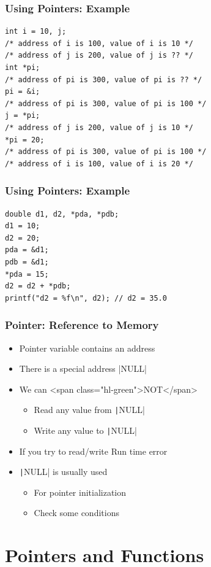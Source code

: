 \documentclass{../c-lecture}
\begin{document}
\begin{frame}[fragile]
  \frametitle{Using Pointers: Example}
  \begin{verbatim}
int i = 10, j;
/* address of i is 100, value of i is 10 */
/* address of j is 200, value of j is ?? */
int *pi;
/* address of pi is 300, value of pi is ?? */
pi = &i;
/* address of pi is 300, value of pi is 100 */
j = *pi;
/* address of j is 200, value of j is 10 */
*pi = 20;
/* address of pi is 300, value of pi is 100 */
/* address of i is 100, value of i is 20 */
  \end{verbatim}
\end{frame}

\begin{frame}[fragile]
  \frametitle{Using Pointers: Example}
  \begin{verbatim}
double d1, d2, *pda, *pdb;
d1 = 10;
d2 = 20;
pda = &d1;
pdb = &d1;
*pda = 15;
d2 = d2 + *pdb;
printf("d2 = %f\n", d2); // d2 = 35.0
  \end{verbatim}
\end{frame}

\begin{frame}
  \frametitle{Pointer: Reference to Memory}
  \begin{itemize}
    \item Pointer variable contains an address
    \item There is a special address
    |NULL|
    \item We can <span class="hl-green">NOT</span>
    \begin{itemize}
      \item Read any value from \texttt|NULL|
      \item Write any value to \texttt|NULL|
    \end{itemize}
    \item If you try to read/write \textrightarrow Run time error
    \item \texttt|NULL| is usually used
    \begin{itemize}
      \item For pointer initialization
      \item Check some conditions
    \end{itemize}
  \end{itemize}
\end{frame}

\section{Pointers and Functions}
\end{document}

